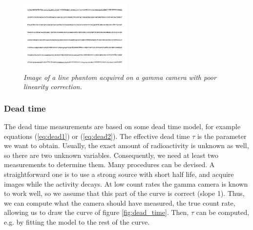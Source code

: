 \documentclass[11pt,oneside]{book}
\begin{document}
\begin{figure}[tb]
\centering
\includegraphics[width=0.5\textwidth]{figs/fig_qc_linearity.pdf}
\caption{\label{fig:qc_linearity} \emph{Image of a line phantom acquired on a
gamma camera with poor linearity correction.}}
\end{figure}

\subsubsection{Dead time}
The dead time measurements are based on some dead time model, for example
equations (\ref{eq:dead1}) or (\ref{eq:dead2}). The effective dead time $\tau$
is the parameter we want to obtain. Usually, the exact amount of radioactivity
is unknown as well, so there are two unknown variables. Consequently, we need
at least two measurements to determine them. Many procedures can be devised. A
straightforward one is to use a strong source with short half life, and
acquire images while the activity decays. At low count rates the gamma camera
is known to work well, so we assume that this part of the curve is correct
(slope 1). Thus, we can compute what the camera should have measured, the true
count rate, allowing us to draw the curve of figure \ref{fig:dead_time}. Then,
$\tau$ can be computed, e.g. by fitting the model to the rest of the curve.
\end{document}
